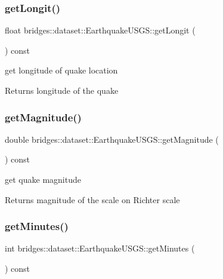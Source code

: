 \subsubsection{\texorpdfstring{getLongit()}{getLongit()}}
{\footnotesize\ttfamily float bridges\+::dataset\+::\+Earthquake\+U\+S\+G\+S\+::get\+Longit (\begin{DoxyParamCaption}{ }\end{DoxyParamCaption}) const\hspace{0.3cm}{\ttfamily [inline]}}



get longitude of quake location 

\begin{DoxyReturn}{Returns}
longitude of the quake 
\end{DoxyReturn}
\mbox{\label{classbridges_1_1dataset_1_1_earthquake_u_s_g_s_aeb1be6b0dece1240da3123db9f9c2d9b}} 
\subsubsection{\texorpdfstring{getMagnitude()}{getMagnitude()}}
{\footnotesize\ttfamily double bridges\+::dataset\+::\+Earthquake\+U\+S\+G\+S\+::get\+Magnitude (\begin{DoxyParamCaption}{ }\end{DoxyParamCaption}) const\hspace{0.3cm}{\ttfamily [inline]}}



get quake magnitude 

\begin{DoxyReturn}{Returns}
magnitude of the scale on Richter scale 
\end{DoxyReturn}
\mbox{\label{classbridges_1_1dataset_1_1_earthquake_u_s_g_s_a2ca08fed1bfc867277dbd99cf25fa3ec}} 
\subsubsection{\texorpdfstring{getMinutes()}{getMinutes()}}
{\footnotesize\ttfamily int bridges\+::dataset\+::\+Earthquake\+U\+S\+G\+S\+::get\+Minutes (\begin{DoxyParamCaption}{ }\end{DoxyParamCaption}) const\hspace{0.3cm}{\ttfamily [inline]}}




